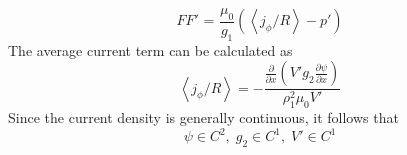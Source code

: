 \begin{equation}
FF'{\text{  =  }}\frac{{{\mu _0}}}{{{g_1}}}\left( {\left\langle {{j_\phi }/R} \right\rangle  - p'} \right)
\end{equation}
The average current term can be calculated as
\begin{equation}
\left\langle {{j_\phi }/R} \right\rangle  =  - \frac{{\frac{\partial }{{\partial x}}\left( {V'{g_2}\frac{{\partial \psi }}{{\partial x}}} \right)}}{{\rho _1^2{\mu _0}V'}}
\end{equation}
Since the current density is generally continuous, it follows that
\begin{equation}
\psi  \in {C^2},\;{g_2} \in {C^1},\;V' \in {C^1}
\end{equation}


